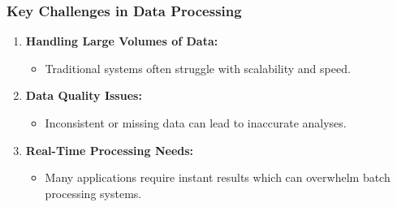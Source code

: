 \documentclass[aspectratio=169]{beamer}
\begin{document}
\begin{frame}
    \frametitle{Key Challenges in Data Processing}
    \begin{enumerate}
        \item \textbf{Handling Large Volumes of Data:} 
        \begin{itemize}
            \item Traditional systems often struggle with scalability and speed.
        \end{itemize}
        
        \item \textbf{Data Quality Issues:} 
        \begin{itemize}
            \item Inconsistent or missing data can lead to inaccurate analyses.
        \end{itemize}
        
        \item \textbf{Real-Time Processing Needs:}
        \begin{itemize}
            \item Many applications require instant results which can overwhelm batch processing systems.
        \end{itemize}
    \end{enumerate}
\end{frame}
\end{document}
